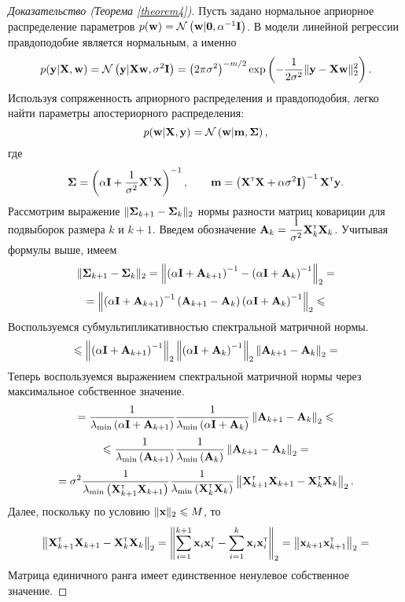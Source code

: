 \begin{proof}[Доказательство (Теорема \ref{theorem4})]
    Пусть задано нормальное априорное распределение параметров $p(\mathbf{w}) = \mathcal{N}\left( \mathbf{w} | \mathbf{0}, \alpha^{-1} \mathbf{I} \right)$. В модели линейной регрессии правдоподобие является нормальным, а именно
    \[ p(\mathbf{y} | \mathbf{X}, \mathbf{w}) = \mathcal{N}\left( \mathbf{y} | \mathbf{X} \mathbf{w}, \sigma^2 \mathbf{I} \right) = \left( 2\pi\sigma^2 \right)^{-m/2} \exp\left( -\dfrac{1}{2\sigma^2} \| \mathbf{y} - \mathbf{X} \mathbf{w} \|_2^2 \right). \]
    Используя сопряженность априорного распределения и правдоподобия, легко найти параметры апостериорного распределения:
    \[ p(\mathbf{w} | \mathbf{X}, \mathbf{y}) = \mathcal{N}\left( \mathbf{w} | \mathbf{m}, \boldsymbol{\Sigma} \right), \]
    где
    \[ \boldsymbol{\Sigma} = \left( \alpha \mathbf{I} + \dfrac{1}{\sigma^2} \mathbf{X}^{\text{\tiny\sffamily\upshape\mdseries T}} \mathbf{X} \right)^{-1}, \qquad \mathbf{m} = \left( \mathbf{X}^{\text{\tiny\sffamily\upshape\mdseries T}} \mathbf{X} + \alpha \sigma^2 \mathbf{I} \right)^{-1} \mathbf{X}^{\text{\tiny\sffamily\upshape\mdseries T}} \mathbf{y}. \]
    Рассмотрим выражение $\| \boldsymbol{\Sigma}_{k+1} - \boldsymbol{\Sigma}_k \|_2$ нормы разности матриц ковариции для подвыборок размера $k$ и $k+1$. Введем обозначение $\mathbf{A}_k = \dfrac{1}{\sigma^2} \mathbf{X}^{\text{\tiny\sffamily\upshape\mdseries T}}_k \mathbf{X}_k$. Учитывая формулы выше, имеем
    \[ \| \boldsymbol{\Sigma}_{k+1} - \boldsymbol{\Sigma}_k \|_2 = \left\| \left( \alpha \mathbf{I} + \mathbf{A}_{k+1} \right)^{-1} - \left( \alpha \mathbf{I} + \mathbf{A}_k \right)^{-1} \right\|_2 = \]
    \[ = \left\| \left( \alpha \mathbf{I} + \mathbf{A}_{k+1} \right)^{-1} \left( \mathbf{A}_{k+1} - \mathbf{A}_k \right) \left( \alpha \mathbf{I} + \mathbf{A}_k \right)^{-1} \right\|_2 \leqslant \]
    Воспользуемся субмультипликативностью спектральной матричной нормы.
    \[ \leqslant \left\| \left( \alpha \mathbf{I} + \mathbf{A}_{k+1} \right)^{-1} \right\|_2 \left\| \left( \alpha \mathbf{I} + \mathbf{A}_k \right)^{-1} \right\|_2 \left\| \mathbf{A}_{k+1} - \mathbf{A}_k \right\|_2 = \]
    Теперь воспользуемся выражением спектральной матричной нормы через максимальное собственное значение.
    \[ = \dfrac{1}{\lambda_{\min}\left( \alpha \mathbf{I} + \mathbf{A}_{k+1} \right)} \dfrac{1}{\lambda_{\min}\left( \alpha \mathbf{I} + \mathbf{A}_k \right)} \left\| \mathbf{A}_{k+1} - \mathbf{A}_k \right\|_2 \leqslant \]
    \[ \leqslant \dfrac{1}{\lambda_{\min}\left( \mathbf{A}_{k+1} \right)} \dfrac{1}{\lambda_{\min}\left( \mathbf{A}_k \right)} \left\| \mathbf{A}_{k+1} - \mathbf{A}_k \right\|_2 = \]
    \[ = \sigma^2  \dfrac{1}{\lambda_{\min}\left( \mathbf{X}^{\text{\tiny\sffamily\upshape\mdseries T}}_{k+1} \mathbf{X}_{k+1} \right)} \dfrac{1}{\lambda_{\min}\left( \mathbf{X}^{\text{\tiny\sffamily\upshape\mdseries T}}_k \mathbf{X}_k \right)} \left\| \mathbf{X}^{\text{\tiny\sffamily\upshape\mdseries T}}_{k+1} \mathbf{X}_{k+1} - \mathbf{X}^{\text{\tiny\sffamily\upshape\mdseries T}}_k \mathbf{X}_k \right\|_2. \]
    Далее, поскольку по условию $\| \mathbf{x} \|_2 \leqslant M$, то
    \[ \left\| \mathbf{X}^{\text{\tiny\sffamily\upshape\mdseries T}}_{k+1} \mathbf{X}_{k+1} - \mathbf{X}^{\text{\tiny\sffamily\upshape\mdseries T}}_k \mathbf{X}_k \right\|_2 = \left\| \sum\limits_{i=1}^{k+1} \mathbf{x}_i \mathbf{x}_i^{\text{\tiny\sffamily\upshape\mdseries T}} - \sum\limits_{i=1}^{k} \mathbf{x}_i \mathbf{x}_i^{\text{\tiny\sffamily\upshape\mdseries T}} \right\|_2 = \left\| \mathbf{x}_{k+1} \mathbf{x}_{k+1}^{\text{\tiny\sffamily\upshape\mdseries T}} \right\|_2 = \]
    Матрица единичного ранга имеет единственное ненулевое собственное значение.

\end{proof}
